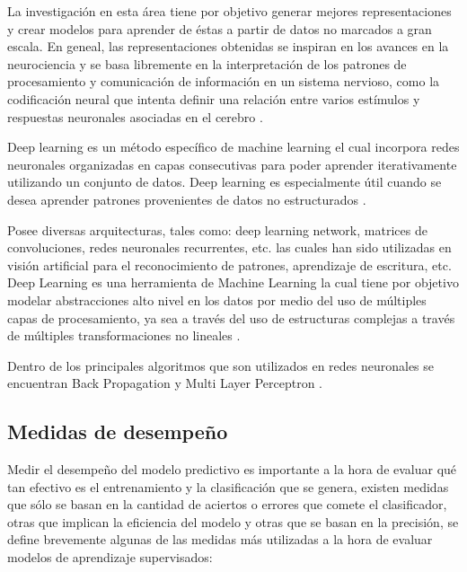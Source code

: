 La investigación en esta área tiene por objetivo generar mejores representaciones y crear modelos para aprender de éstas a partir de datos no marcados a gran escala. En geneal, las representaciones obtenidas se inspiran en los avances en la neurociencia y se basa libremente en la interpretación de los patrones de procesamiento y comunicación de información en un sistema nervioso, como la codificación neural que intenta definir una relación entre varios estímulos y respuestas neuronales asociadas en el cerebro \cite{MAL-006}.

Deep learning es un método específico de machine learning el cual incorpora redes neuronales organizadas en capas consecutivas para poder aprender iterativamente utilizando un conjunto de datos. Deep learning es especialmente útil cuando se desea aprender patrones provenientes de datos no estructurados \cite{SIG-039}.

Posee diversas arquitecturas, tales como: deep learning network, matrices de convoluciones, redes neuronales recurrentes, etc. las cuales han sido utilizadas en visión artificial para el reconocimiento de patrones, aprendizaje de escritura, etc. Deep Learning es una herramienta de Machine Learning la cual tiene por objetivo modelar abstracciones alto nivel en los datos por medio del uso de múltiples capas de procesamiento, ya sea a través del uso de estructuras complejas a través de múltiples transformaciones no lineales \cite{arel2010deep}.

Dentro de los principales algoritmos que son utilizados en redes neuronales se encuentran Back Propagation \cite{HECHTNIELSEN199265} y Multi Layer Perceptron \cite{80266}.

\subsection{Medidas de desempeño}

Medir el desempeño del modelo predictivo es importante a la hora de evaluar qué tan efectivo es el entrenamiento y la clasificación que se genera, existen medidas que sólo se basan en la cantidad de aciertos o errores que comete el clasificador, otras que implican la eficiencia del modelo y otras que se basan en la precisión, se define brevemente algunas de las medidas más utilizadas a la hora de evaluar modelos de aprendizaje supervisados:

